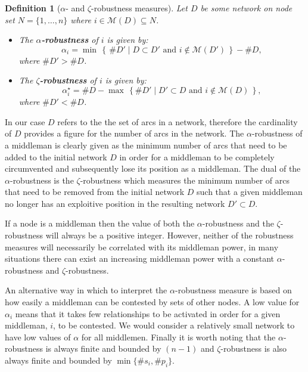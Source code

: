 \documentclass[11pt,fleqn]{article}
\newtheorem{definition}[theorem]{Definition}
\begin{document}
\begin{definition}[$\alpha$- and $\zeta$-robustness measures] \label{robustness}
Let $D$ be some network on node set $N = \{1,\ldots,n\}$ where $i \in \mathcal{M}(D) \subseteq N$. 
\begin{itemize}
	\item[(a)] The \textbf{$\alpha$-robustness} of $i$ is given by:
	\begin{equation} 
	\alpha_{i} = \min \, \left\{ \, \# D' \mid D \subset D' \mbox{ and } i \notin \mathcal{M}(D') \, \right\} - \# D , 
	\end{equation}
	where $\# D' > \# D$.

	\item[(b)] The \textbf{$\zeta$-robustness} of $i$ is given by:
	\begin{equation} 
	\alpha_{i}^{\star} = \# D - \max \, \left\{ \# D' \mid D' \subset D \mbox{ and } i \notin \mathcal{M}(D) \, \right\} , 
	\end{equation} 
	where $\# D' < \# D$.
\end{itemize}
\end{definition}

In our case $D$ refers to the the set of arcs in a network, therefore the cardinality of $D$ provides a figure for the number of arcs in the network. The $\alpha$-robustness of a middleman is clearly given as the minimum number of arcs that need to be added to the initial network $D$ in order for a middleman to be completely circumvented and subsequently lose its position as a middleman. The dual of the $\alpha$-robustness is the $\zeta$-robustness which measures the minimum number of arcs that need to be removed from the initial network $D$ such that a given middleman no longer has an exploitive position in the resulting network $D' \subset D$.

If a node is a middleman then the value of both the $\alpha$-robustness and the $\zeta$-robustness will always be a positive integer. However, neither of the robustness measures will necessarily be correlated with its middleman power, in many situations there can exist an increasing middleman power with a constant $\alpha$-robustness and $\zeta$-robustness.

An alternative way in which to interpret the $\alpha$-robustness measure is based on how easily a middleman can be contested by sets of other nodes. A low value for $\alpha_{i}$ means that it takes few relationships to be activated in order for a given middleman, $i$, to be contested. We would consider a relatively small network to have low values of $\alpha$ for all middlemen. Finally it is worth noting that the $\alpha$-robustness is always finite and bounded by $(n-1)$ and $\zeta$-robustness is also always finite and bounded by $\min \{ \# s_{i}, \# p_{i} \}$. 
\end{document}
